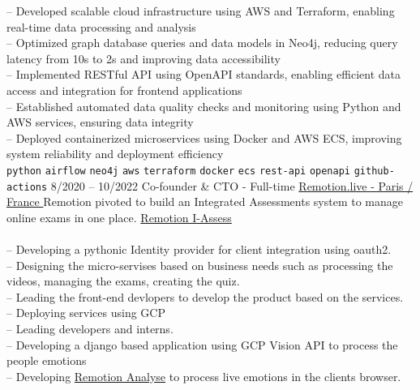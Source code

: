 \begin{entrylist}
{        -- Developed scalable cloud infrastructure using AWS and Terraform, enabling real-time data processing and analysis \\
        -- Optimized graph database queries and data models in Neo4j, reducing query latency from 10s to 2s and improving data accessibility \\
        -- Implemented RESTful API using OpenAPI standards, enabling efficient data access and integration for frontend applications \\
        -- Established automated data quality checks and monitoring using Python and AWS services, ensuring data integrity \\
        -- Deployed containerized microservices using Docker and AWS ECS, improving system reliability and deployment efficiency \\
        \texttt{python}\slashsep
        \texttt{airflow}\slashsep
        \texttt{neo4j}\slashsep
        \texttt{aws}\slashsep
        \texttt{terraform}\slashsep
        \texttt{docker}\slashsep
        \texttt{ecs}\slashsep
        \texttt{rest-api}\slashsep
        \texttt{openapi}\slashsep
        \texttt{github-actions}\slashsep
    }
    \entry
    {8/2020 -- 10/2022}
    {Co-founder \& CTO - Full-time}
    {\href{https://remotion.live/}{Remotion.live - Paris / France }}
    {Remotion pivoted to build an Integrated Assessments system to manage online exams in one place.
        \href{https://remotion.live/} {Remotion I-Assess} \\\\
        -- Developing a pythonic Identity provider for client integration using oauth2. \\
        -- Designing the micro-servises based on business needs such as processing the videos, managing the exams, creating the quiz. \\
        -- Leading the front-end devlopers to develop the product based on the services. \\
        -- Deploying services using GCP \\
        -- Leading developers and interns. \\
        -- Developing a django based application using GCP Vision API to process the people emotions \\
        -- Developing \href{https://analyse.remotion.live/} {Remotion Analyse} to process live emotions in the clients browser. \\
}
\end{entrylist}
